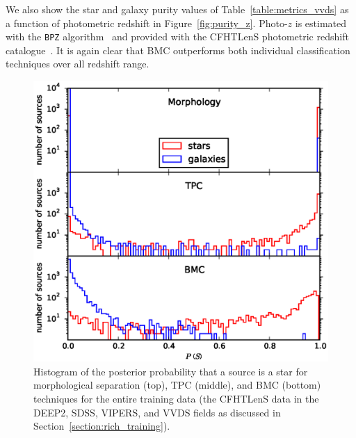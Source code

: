 \documentclass[useAMS,usenatbib]{mn2e}
\begin{document}
We also show the star and galaxy purity values
of Table~\ref{table:metrics_vvds} as a function of
photometric redshift in Figure~\ref{fig:purity_z}.
Photo-$z$ is estimated with
the \texttt{BPZ} algorithm~\citep{benitez2000bayesian}
and provided with
the CFHTLenS photometric redshift catalogue~\citep{Hildebrandt2012}.
It is again clear that BMC outperforms
both individual classification techniques over all redshift range.

\begin{figure}
  \begin{minipage}[t]{0.49\linewidth}
    \includegraphics[width=\textwidth]{figures/p_dist_all.eps}
    \caption{Histogram of the posterior probability that
             a source is a star for morphological separation (top),
             TPC (middle), and BMC (bottom) techniques
             for the entire training data
             (the CFHTLenS data in the DEEP2, SDSS, VIPERS, and VVDS
             fields as discussed in Section~\ref{section:rich_training}).}
    \label{fig:p_dist_all}
  \end{minipage}
  \hfill
  \begin{minipage}[t]{0.49\linewidth}

\end{minipage}
\end{figure}
\end{document}
